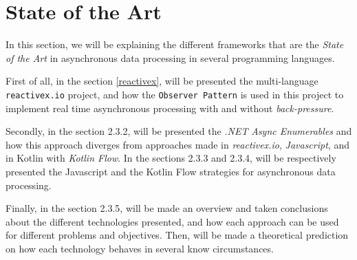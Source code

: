 

\section{State of the Art} %
\label{sec:state_of_the_art}

In this section, we will be explaining the different frameworks that are the \textit{State of the Art} in asynchronous data processing in several programming languages.

First of all, in the section \ref{reactivex}, will be presented the multi-language \texttt{reactivex.io} project, and how the \texttt{Observer Pattern} is used in this project to implement real time asynchronous processing with and without \textit{back-pressure}.

Secondly, in the section 2.3.2, will be presented the \textit{.NET} \textit{Async Enumerables} and how this approach diverges from approaches made in \textit{reactivex.io}, \textit{Javascript}, and in Kotlin with \textit{Kotlin Flow}.
In the sections 2.3.3 and 2.3.4, will be respectively presented the Javascript and the Kotlin Flow strategies for asynchronous data processing.

Finally, in the section 2.3.5, will be made an overview and taken conclusions about the different technologies presented, and how each approach can be used for different problems and objectives. Then, will be made a theoretical prediction on how each technology behaves in several know circumstances. 

